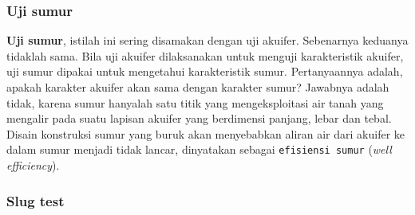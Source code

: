 \begin{table}[]
\centering
\caption{Tujuan pengujian dan disain pengujian \cite{aitchison2008aquifer} }
\label{tujuan_pengujian}
\end{table}


\subsubsection{Uji sumur}

\textbf{Uji sumur}, istilah ini sering disamakan dengan uji akuifer. Sebenarnya keduanya tidaklah sama. Bila uji akuifer dilaksanakan untuk menguji karakteristik akuifer, uji sumur dipakai untuk mengetahui karakteristik sumur. Pertanyaannya adalah, apakah karakter akuifer akan sama dengan karakter sumur? Jawabnya adalah tidak, karena sumur hanyalah satu titik yang mengeksploitasi air tanah yang mengalir pada suatu lapisan akuifer yang berdimensi panjang, lebar dan tebal. Disain konstruksi sumur yang buruk akan menyebabkan aliran air dari akuifer ke dalam sumur menjadi tidak lancar, dinyatakan sebagai \verb|efisiensi sumur| (\textit{well efficiency}).

\subsubsection{Slug test}

